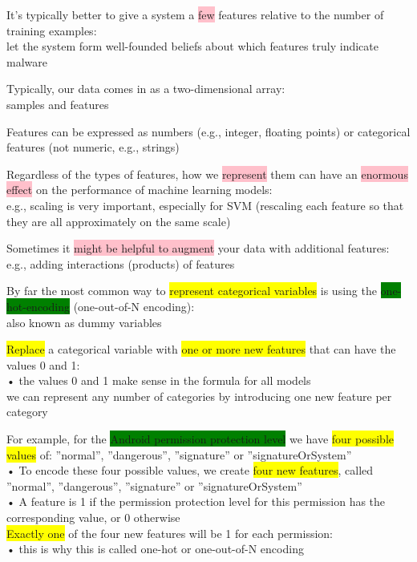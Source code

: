 \documentclass[]{project_plan}
\begin{document}
It’s typically better to give a system a \colorbox{pink}{few} features relative to the number of training examples:\\
let the system form well-founded beliefs about which features truly indicate malware

Typically, our data comes in as a two-dimensional array:\\
samples and features

Features can be expressed as numbers (e.g., integer, floating points) or categorical features (not numeric, e.g., strings)

Regardless of the types of features, how we \colorbox{pink}{represent} them can have an \colorbox{pink}{enormous effect} on the performance of machine learning models:\\
e.g., scaling is very important, especially for SVM (rescaling each feature so that they are all approximately on the same scale)

Sometimes it \colorbox{pink}{might be helpful to augment} your data with additional features:\\
e.g., adding interactions (products) of features

By far the most common way to \colorbox{yellow}{represent categorical variables} is using the \colorbox{green}{one-hot-encoding} (one-out-of-N encoding):\\
also known as dummy variables

\colorbox{yellow}{Replace} a categorical variable with \colorbox{yellow}{one or more new features} that can have the values 0 and 1:\\
• the values 0 and 1 make sense in the formula for all models\\
we can represent any number of categories by introducing one new feature per category

For example, for the \colorbox{green}{Android permission protection level} we have \colorbox{yellow}{four possible values} of: ”normal”, ”dangerous”, ”signature” or ”signatureOrSystem”\\
• To encode these four possible values, we create \colorbox{yellow}{four new features}, called ”normal”, ”dangerous”, ”signature” or ”signatureOrSystem”\\
• A feature is 1 if the permission protection level for this permission has the corresponding value, or 0 otherwise\\
\colorbox{yellow}{Exactly one} of the four new features will be 1 for each permission:\\
• this is why this is called one-hot or one-out-of-N encoding
\end{document}

